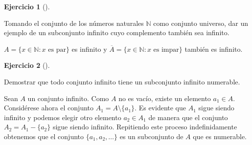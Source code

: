 \documentclass[
  spanish,
  a4paper,
]{scrreport}
\theoremstyle{definition}
\newtheorem{exercise}{Ejercicio}[chapter]
\theoremstyle{remark}
\begin{document}
\begin{exercise}[]\protect\hypertarget{exr-ejemplo-conjunto-infinito-complemento}{}\label{exr-ejemplo-conjunto-infinito-complemento}

Tomando el conjunto de los números naturales \(\mathbb{N}\) como
conjunto universo, dar un ejemplo de un subconjunto infinito cuyo
complemento también sea infinito.

\end{exercise}

\begin{tcolorbox}[enhanced jigsaw, arc=.35mm, bottomrule=.15mm, bottomtitle=1mm, breakable, colback=white, colbacktitle=quarto-callout-tip-color!10!white, colframe=quarto-callout-tip-color-frame, coltitle=black, left=2mm, leftrule=.75mm, opacityback=0, opacitybacktitle=0.6, rightrule=.15mm, title=\textcolor{quarto-callout-tip-color}{\faLightbulb}\hspace{0.5em}{Solución}, titlerule=0mm, toprule=.15mm, toptitle=1mm]

\(A=\{x\in\mathbb{N}: x \mbox{ es par}\}\) es infinito y
\(\overline A=\{x\in\mathbb{N}: x \mbox{ es impar}\}\) también es
infinito.

\end{tcolorbox}

\begin{exercise}[]\protect\hypertarget{exr-subconjunto-infinito-numerable}{}\label{exr-subconjunto-infinito-numerable}

Demostrar que todo conjunto infinito tiene un subconjunto infinito
numerable.

\end{exercise}

\begin{tcolorbox}[enhanced jigsaw, arc=.35mm, bottomrule=.15mm, bottomtitle=1mm, breakable, colback=white, colbacktitle=quarto-callout-tip-color!10!white, colframe=quarto-callout-tip-color-frame, coltitle=black, left=2mm, leftrule=.75mm, opacityback=0, opacitybacktitle=0.6, rightrule=.15mm, title=\textcolor{quarto-callout-tip-color}{\faLightbulb}\hspace{0.5em}{Solución}, titlerule=0mm, toprule=.15mm, toptitle=1mm]

Sean \(A\) un conjunto infinito. Como \(A\) no es vacío, existe un
elemento \(a_1\in A\). Considérese ahora el conjunto
\(A_1 = A\setminus \{a_1\}\). Es evidente que \(A_1\) sigue siendo
infinito y podemos elegir otro elemento \(a_2\in A_1\) de manera que el
conjunto \(A_2=A_1-\{a_2\}\) sigue siendo infinito. Repitiendo este
proceso indefinidamente obtenemos que el conjunto
\(\{a_1, a_2, \ldots\}\) es un subconjunto de \(A\) que es numerable.

\end{tcolorbox}
\end{document}
